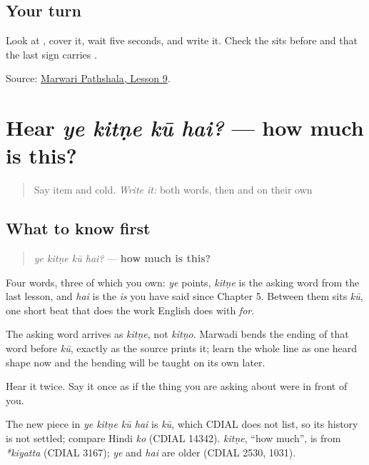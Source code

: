 \subsection*{Your turn}
Look at \textbf{}, cover it, wait five seconds, and write it. Check the \textbf{} sits before \textbf{} and that the last sign carries \textbf{}.

\begin{tcolorbox}[breakable,colback=teal!4,colframe=teal!35!black,title={Before you move on}]
Source: \href{https://www.marwaripathshala.com/marwari-lesson-9-english}{Marwari Pathshala, Lesson 9}.
\end{tcolorbox}
\section[ye kitṇe kū hai?]{Hear \emph{ye kitṇe kū hai?} — how much is this?}

\label{lesson:MW-C22-hear-price-question}



\begin{quote}
Say item and cold. \emph{Write it:} both words, then \textbf{} and \textbf{} on their own
\end{quote}

\subsection*{What to know first}
\begin{quote}
\emph{ye kitṇe kū hai?} — \textbf{how much is this?}
\end{quote}

Four words, three of which you own: \emph{ye} points, \emph{kitṇe} is the asking word from the last lesson, and \emph{hai} is the \emph{is} you have said since Chapter 5. Between them sits \emph{kū}, one short beat that does the work English does with \emph{for}.

The asking word arrives as \emph{kitṇe}, not \emph{kitṇo}. Marwadi bends the ending of that word before \emph{kū}, exactly as the source prints it; learn the whole line as one heard shape now and the bending will be taught on its own later.

Hear it twice. Say it once as if the thing you are asking about were in front of you.

\begin{cousinweb}
The new piece in \emph{ye kitṇe kū hai} is \emph{kū}, which CDIAL does not list, so its history is not settled; compare Hindi \emph{ko} (CDIAL 14342). \emph{kitṇe}, \textquotedblleft{}how much\textquotedblright{}, is from \emph{*kiyatta} (CDIAL 3167); \emph{ye} and \emph{hai} are older (CDIAL 2530, 1031).
\end{cousinweb}

